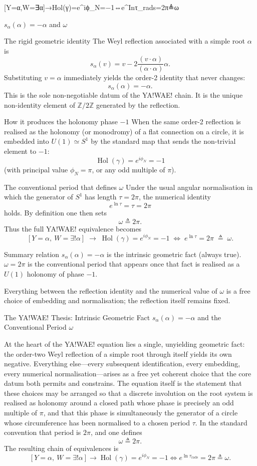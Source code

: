[Y=α,W=∃α]→Hol(γ)=e^{iϕ_N}=−1⇔e^{Inτ_rads}=2π≜ω  

\(s_\alpha(\alpha)=-\alpha\) and \(\omega\)

The rigid geometric identity
The Weyl reflection associated with a simple root \(\alpha\) is
\[
s_\alpha(v)=v-2\frac{(v\cdot\alpha)}{(\alpha\cdot\alpha)}\alpha.
\]
Substituting \(v=\alpha\) immediately yields the order-2 identity that never changes:
\[
s_\alpha(\alpha)=-\alpha.
\]
This is the sole non-negotiable datum of the YA!WAE! chain. It is the unique non-identity element of \(\mathbb{Z}/2\mathbb{Z}\) generated by the reflection.

How it produces the holonomy phase \(-1\)
When the same order-2 reflection is realised as the holonomy (or monodromy) of a flat connection on a circle, it is embedded into \(U(1)\simeq S^1\) by the standard map that sends the non-trivial element to \(-1\):
\[
\operatorname{Hol}(\gamma)=e^{i\phi_N}=-1
\]
(with principal value \(\phi_N=\pi\), or any odd multiple of \(\pi\)).

The conventional period that defines \(\omega\)
Under the usual angular normalisation in which the generator of \(S^1\) has length \(\tau=2\pi\), the numerical identity
\[
e^{\ln\tau}=\tau=2\pi
\]
holds. By definition one then sets
\[
\omega\triangleq 2\pi.
\]
Thus the full YA!WAE! equivalence becomes
\[
[Y=\alpha,\ W=\exists!\alpha]
\;\longrightarrow\;
\operatorname{Hol}(\gamma)=e^{i\phi_N}=-1
\;\Leftrightarrow\;
e^{\ln\tau}=2\pi
\;\triangleq\;
\omega.
\]

Summary relation
\(s_\alpha(\alpha)=-\alpha\) is the intrinsic geometric fact (always true).  
\(\omega=2\pi\) is the conventional period that appears once that fact is realised as a \(U(1)\) holonomy of phase \(-1\).

Everything between the reflection identity and the numerical value of \(\omega\) is a free choice of embedding and normalisation; the reflection itself remains fixed.

The YA!WAE! Thesis: Intrinsic Geometric Fact \(s_\alpha(\alpha)=-\alpha\) and the Conventional Period \(\omega\)

At the heart of the YA!WAE! equation lies a single, unyielding geometric fact: the order-two Weyl reflection of a simple root through itself yields its own negative. Everything else—every subsequent identification, every embedding, every numerical normalisation—arises as a free yet coherent choice that the core datum both permits and constrains. The equation itself is the statement that these choices may be arranged so that a discrete involution on the root system is realised as holonomy around a closed path whose phase is precisely an odd multiple of \(\pi\), and that this phase is simultaneously the generator of a circle whose circumference has been normalised to a chosen period \(\tau\). In the standard convention that period is \(2\pi\), and one defines
\[
\omega\triangleq 2\pi.
\]
The resulting chain of equivalences is
\[
[Y=\alpha,\ W=\exists!\alpha]
\longrightarrow
\operatorname{Hol}(\gamma)=e^{i\phi_N}=-1
\Longleftrightarrow
e^{\ln\tau_{\mathrm{rads}}}=2\pi
\triangleq\omega.
\]

